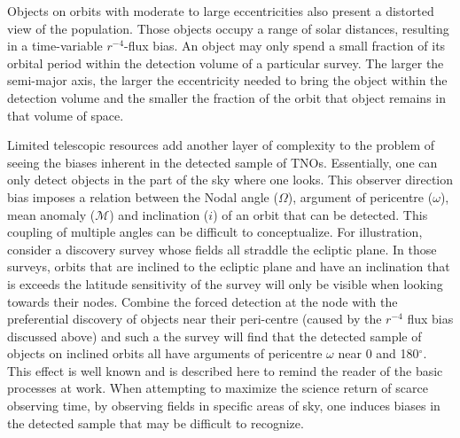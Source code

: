 \documentclass[preprint]{aastex62}
\begin{document}
Objects on orbits with moderate to large eccentricities also present a distorted view of the population.  Those objects occupy a range of solar distances, resulting in a time-variable $r^{-4}$-flux bias. An object may only spend a small fraction of its orbital period within the detection volume of a particular survey. The larger the semi-major axis, the larger the eccentricity needed to bring the object within the detection volume and the smaller the fraction of the orbit that object remains in that volume of space.

Limited telescopic resources add another layer of complexity to the problem of seeing the biases inherent in the detected sample of TNOs.  Essentially, one can only detect objects in the part of the sky where one looks.  This observer direction bias imposes a relation between the Nodal angle ($\Omega$), argument of pericentre ($\omega$), mean anomaly ($\mathcal{M}$) and inclination ($i$) of an orbit that can be detected.  This coupling of multiple angles can be difficult to conceptualize.  For illustration, consider a discovery survey whose fields all straddle the ecliptic plane.  In those surveys,  orbits that are inclined to the ecliptic plane and have an inclination that is exceeds the latitude sensitivity of the survey will only be visible when looking towards their nodes. Combine the forced detection at the node with the preferential discovery of objects near their peri-centre (caused by the $r^{-4}$ flux bias discussed above) and such a the survey will find that the detected sample of objects on inclined orbits all have arguments of pericentre $\omega$ near 0 and 180$^{\circ}$. This effect is well known and is described here to remind the reader of the basic processes at work.  When attempting to maximize the science return of scarce observing time, by observing fields in specific areas of sky, one induces biases in the detected sample that may be difficult to recognize. 
\end{document}
